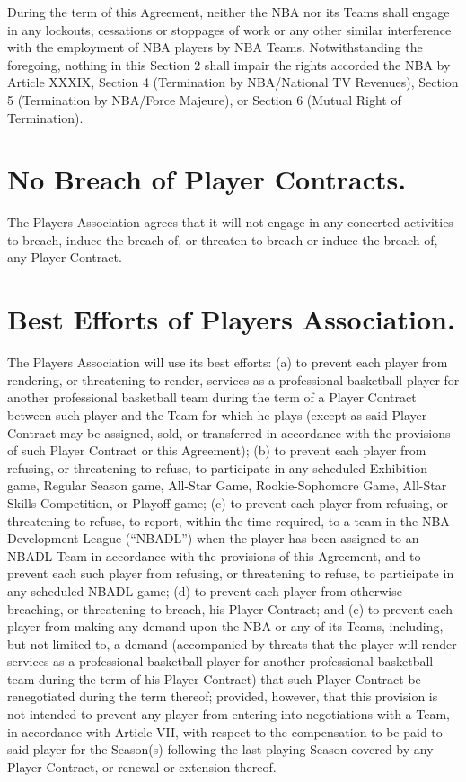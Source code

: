 \documentclass[
]{book}
\begin{document}
During the term of this Agreement, neither the NBA nor its Teams shall engage in any lockouts, cessations or stoppages of work or any other similar interference with the employment of NBA players by NBA Teams. Notwithstanding the foregoing, nothing in this Section 2 shall impair the rights accorded the NBA by Article XXXIX, Section 4 (Termination by NBA/National TV Revenues), Section 5 (Termination by NBA/Force Majeure), or Section 6 (Mutual Right of Termination).

\hypertarget{no-breach-of-player-contracts.}{%
\section{No Breach of Player Contracts.}\label{no-breach-of-player-contracts.}}

The Players Association agrees that it will not engage in any concerted activities to breach, induce the breach of, or threaten to breach or induce the breach of, any Player Contract.

\hypertarget{best-efforts-of-players-association.}{%
\section{Best Efforts of Players Association.}\label{best-efforts-of-players-association.}}

The Players Association will use its best efforts: (a) to prevent each player from rendering, or threatening to render, services as a professional basketball player for another professional basketball team during the term of a Player Contract between such player and the Team for which he plays (except as said Player Contract may be assigned, sold, or transferred in accordance with the provisions of such Player Contract or this Agreement); (b) to prevent each player from refusing, or threatening to refuse, to participate in any scheduled Exhibition game, Regular Season game, All-Star Game, Rookie-Sophomore Game, All-Star Skills Competition, or Playoff game; (c) to prevent each player from refusing, or threatening to refuse, to report, within the time required, to a team in the NBA Development League (``NBADL'') when the player has been assigned to an NBADL Team in accordance with the provisions of this Agreement, and to prevent each such player from refusing, or threatening to refuse, to participate in any scheduled NBADL game; (d) to prevent each player from otherwise breaching, or threatening to breach, his Player Contract; and (e) to prevent each player from making any demand upon the NBA or any of its Teams, including, but not limited to, a demand (accompanied by threats that the player will render services as a professional basketball player for another professional basketball team during the term of his Player Contract) that such Player Contract be renegotiated during the term thereof; provided, however, that this provision is not intended to prevent any player from entering into negotiations with a Team, in accordance with Article VII, with respect to the compensation to be paid to said player for the Season(s) following the last playing Season covered by any Player Contract, or renewal or extension thereof.
\end{document}
